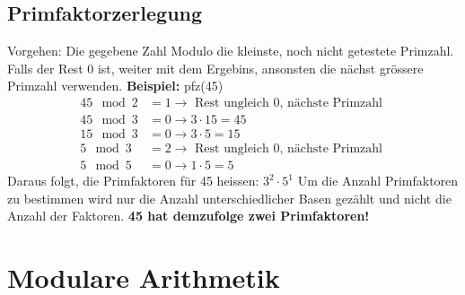 \subsection{Primfaktorzerlegung} %
\label{sub:primfaktorzerlegung}
Vorgehen: Die gegebene Zahl Modulo die kleinste, noch nicht getestete Primzahl. Falls der Rest 0 ist, weiter mit dem Ergebins, ansonsten die nächst grössere Primzahl verwenden.\newline
\textbf{Beispiel:} pfz(45)
\begin{align*}
	45 \mod 2 &= 1 \rightarrow \text{ Rest ungleich 0, nächste Primzahl } \\
	45 \mod 3 &= 0 \rightarrow 3 \cdot 15 = 45 \\
	15 \mod 3 &= 0 \rightarrow 3 \cdot 5 = 15 \\
	5 \mod 3 &= 2  \rightarrow \text{ Rest ungleich 0, nächste Primzahl } \\
	5 \mod 5 &= 0 \rightarrow 1 \cdot 5 = 5
\end{align*}
Daraus folgt, die Primfaktoren für 45 heissen: \( 3^2 \cdot 5^1 \)\newline
Um die Anzahl Primfaktoren zu bestimmen wird nur die Anzahl unterschiedlicher Basen gezählt und nicht die Anzahl der Faktoren. \textbf{45 hat demzufolge zwei Primfaktoren!}

\section{Modulare Arithmetik} %
\label{sec:modulare_arihmetik}

